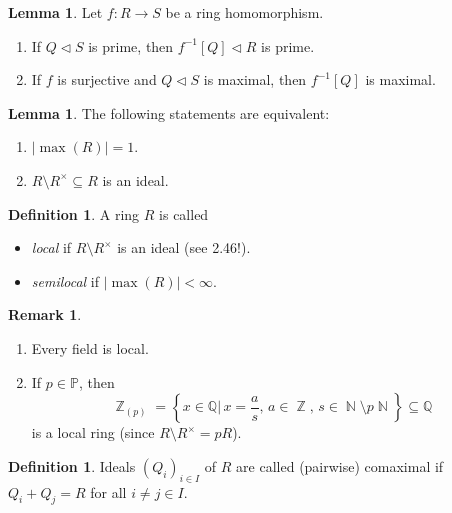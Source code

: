 \documentclass[12pt,a4paper]{report}
\theoremstyle{definition}
\newtheorem{lemma}[theorem]{Lemma}
\newtheorem{defn}[theorem]{Definition}
\newtheorem*{remark}{Remark}
\theoremstyle{num.custom-title}
\DeclareMathOperator{\N}{\mathbb{N}}
\DeclareMathOperator{\Z}{\mathbb{Z}}
\DeclareMathOperator{\sm}{\setminus}
\DeclareMathOperator{\sse}{\subseteq}
\newcommand{\Q}{\mathbb{Q}}
\renewcommand{\P}{\mathbb{P}}
\begin{document}
\begin{lemma}
Let $f:R \to S$ be a ring homomorphism.
\begin{enumerate}
\item If $Q \lhd S$ is prime, then $f^{-1}[Q] \lhd R$ is prime.
\item If $f$ is surjective and $Q \lhd S$ is maximal, then $f^{-1}[Q]$ is maximal.
\end{enumerate}
\end{lemma}

\begin{lemma}
The following statements are equivalent:
\begin{enumerate}
\item $|\max(R)|=1$.
\item $R \sm R^\times \sse R$ is an ideal.
\end{enumerate}
\end{lemma}

\begin{defn}
A ring $R$ is called
\begin{itemize}
\item \emph{local} if $R \sm R^\times$ is an ideal (see 2.46!).
\item \emph{semilocal} if $|\max(R)|<\infty$.
\end{itemize}
\end{defn}

\begin{remark}\ 
\begin{enumerate}
\item Every field is local.
\item If $p \in \P$, then
\[
\Z_{(p)} = \left\{ x \in \Q \Big| \, x=\frac{a}{s},\, a \in \Z,\, s \in \N \sm p\N\right\} \sse \Q
\]
is a local ring (since $R \sm R^\times = pR$).
\end{enumerate}
\end{remark}

\begin{defn}
Ideals $(Q_i)_{i \in I}$ of $R$ are called (pairwise) comaximal if $Q_i+Q_j=R$ for all $i \neq j \in I$.
\end{defn}
\end{document}

